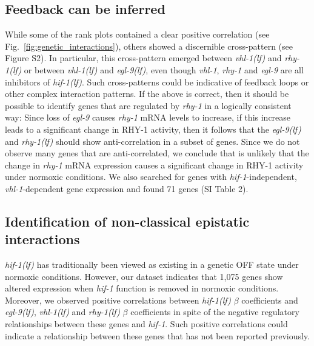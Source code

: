 \documentclass[9pt,twocolumn,twoside]{pnas-new}
\newcommand{\gene}[1]{\mbox{\emph{#1}}}
\newcommand{\egl}{\gene{egl-9(lf)}}
\newcommand{\rhy}{\gene{rhy-1(lf)}}
\newcommand{\vhl}{\gene{vhl-1(lf)}}
\newcommand{\hif}{\gene{hif-1(lf)}}
\newcommand{\hifn}{1,075}
\newcommand{\vhltargets}{71} %
\begin{document}
\subsection*{Feedback can be inferred}
\label{sub:topology}
While some of the rank plots contained a clear positive correlation (see
Fig.~\ref{fig:genetic_interactions}), others showed a discernible cross-pattern
(see Figure S2). In particular, this cross-pattern emerged between \vhl{} and
\rhy{} or between \vhl{} and \egl{}, even though \gene{vhl-1}, \gene{rhy-1} and
\gene{egl-9} are all inhibitors of \hif{}. Such cross-patterns could be
indicative of feedback loops or other complex interaction patterns. If the above
is correct, then it should be possible to identify genes that are regulated by
\gene{rhy-1} in a logically consistent way: Since loss of \gene{egl-9} causes
\gene{rhy-1} mRNA levels to increase, if this increase leads to a significant
change in RHY-1 activity, then it follows that the \egl{} and \rhy{} should show
anti-correlation in a subset of genes. Since we do not observe many genes that
are anti-correlated, we conclude that is unlikely that the change in
\gene{rhy-1} mRNA expression causes a significant change in RHY-1 activity under
normoxic conditions. We also searched for genes with \gene{hif-1}-independent,
\gene{vhl-1}-dependent gene expression and found \vhltargets{} genes
(SI Table 2).

\subsection*{Identification of non-classical epistatic interactions}
\label{sub:hifoh}
\hif{} has traditionally been viewed as existing in a genetic OFF state under
normoxic conditions. However, our dataset indicates that \hifn{} genes show
altered expression when \gene{hif-1} function is removed in normoxic conditions.
Moreover, we observed positive correlations between \hif{} $\beta$ coefficients
and \egl{}, \vhl{} and \rhy{} $\beta$ coefficients in spite of the negative
regulatory relationships between these genes and \gene{hif-1}. Such positive
correlations could indicate a relationship between these genes that has not
been reported previously.
\end{document}
